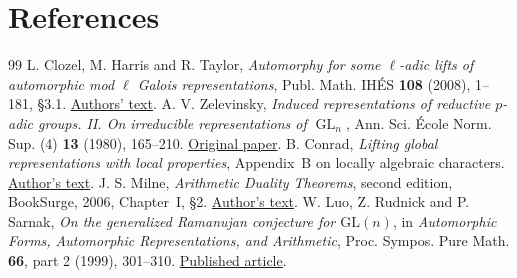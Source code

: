 \documentclass[a4paper,11pt]{article}
\theoremstyle{definition}
\theoremstyle{remark}
\numberwithin{equation}{section}
\newcommand{\GL}{\operatorname{GL}}
\begin{document}
\clearpage
\section{References}\label{nav:bibliography-X}
\begingroup{}\begin{thebibliography}{99}\small
{} L. Clozel, M. Harris and R. Taylor, \emph{Automorphy for some \(\ell\)-adic lifts of automorphic mod \(\ell\) Galois representations}, Publ. Math. IH\'ES \textbf{108} (2008), 1--181, \S3.1. \href{https://virtualmath1.stanford.edu/~rltaylor/twugfin.pdf}{Authors' text}.
 A. V. Zelevinsky, \emph{Induced representations of reductive \(p\)-adic groups. II. On irreducible representations of \(\GL_n\)}, Ann. Sci. \'Ecole Norm. Sup. (4) \textbf{13} (1980), 165--210. \href{https://www.numdam.org/articles/10.24033/asens.1379/}{Original paper}.
 B. Conrad, \emph{Lifting global representations with local properties}, Appendix~B on locally algebraic characters. \href{https://math.stanford.edu/~conrad/papers/locchar.pdf}{Author's text}.
 J. S. Milne, \emph{Arithmetic Duality Theorems}, second edition, BookSurge, 2006, Chapter~I, \S2. \href{https://www.jmilne.org/math/Books/ADTnot.pdf}{Author's text}.
 W. Luo, Z. Rudnick and P. Sarnak, \emph{On the generalized Ramanujan conjecture for $\mathrm{GL}(n)$}, in \emph{Automorphic Forms, Automorphic Representations, and Arithmetic}, Proc. Sympos. Pure Math. \textbf{66}, part 2 (1999), 301--310. \href{https://doi.org/10.1090/pspum/066.2/1703764}{Published article}.
\end{thebibliography}\endgroup
\end{document}
